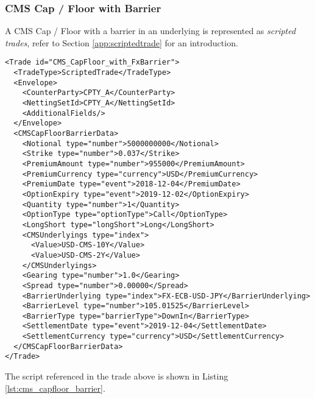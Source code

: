 \subsubsection{CMS Cap / Floor with Barrier} 
 
 
A CMS Cap / Floor with a barrier in an underlying is represented as {\em scripted trades}, refer to Section 
\ref{app:scriptedtrade} for an introduction.
 
\begin{verbatim} 
<Trade id="CMS_CapFloor_with_FxBarrier">
  <TradeType>ScriptedTrade</TradeType>
  <Envelope>
    <CounterParty>CPTY_A</CounterParty>
    <NettingSetId>CPTY_A</NettingSetId>
    <AdditionalFields/>
  </Envelope>
  <CMSCapFloorBarrierData>
    <Notional type="number">5000000000</Notional>
    <Strike type="number">0.037</Strike>
    <PremiumAmount type="number">955000</PremiumAmount>
    <PremiumCurrency type="currency">USD</PremiumCurrency>
    <PremiumDate type="event">2018-12-04</PremiumDate>
    <OptionExpiry type="event">2019-12-02</OptionExpiry>
    <Quantity type="number">1</Quantity>
    <OptionType type="optionType">Call</OptionType>
    <LongShort type="longShort">Long</LongShort>
    <CMSUnderlyings type="index">
      <Value>USD-CMS-10Y</Value>
      <Value>USD-CMS-2Y</Value>
    </CMSUnderlyings>
    <Gearing type="number">1.0</Gearing>
    <Spread type="number">0.00000</Spread>
    <BarrierUnderlying type="index">FX-ECB-USD-JPY</BarrierUnderlying>
    <BarrierLevel type="number">105.01525</BarrierLevel>
    <BarrierType type="barrierType">DownIn</BarrierType>
    <SettlementDate type="event">2019-12-04</SettlementDate>
    <SettlementCurrency type="currency">USD</SettlementCurrency>
  </CMSCapFloorBarrierData>
</Trade>
\end{verbatim} 
 
The script referenced in the trade above is shown in Listing \ref{lst:cms_capfloor_barrier}.
 
